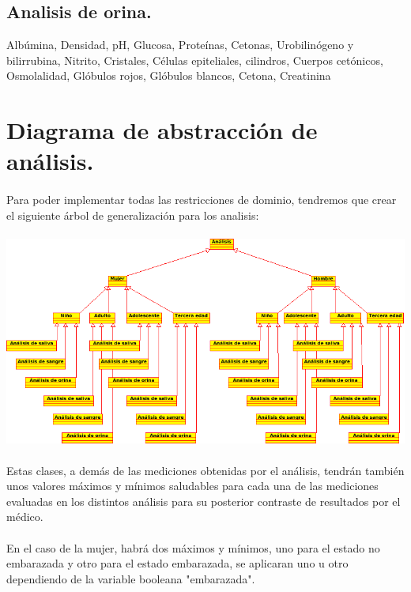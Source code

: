 \documentclass[a4paper,10pt]{article}
\begin{document}
\subsection{Analisis de orina.}
Albúmina, Densidad, pH, Glucosa, Proteínas, Cetonas, Urobilinógeno y bilirrubina, Nitrito, Cristales, Células epiteliales, cilindros, Cuerpos cetónicos, Osmolalidad, Glóbulos rojos, Glóbulos blancos, Cetona, Creatinina
\pagebreak

\section{Diagrama de abstracción de análisis.}
\paragraph{}
Para poder implementar todas las restricciones de dominio, tendremos que crear el siguiente árbol de generalización para los analisis:\\
\vspace{0.7cm}\\
\includegraphics[width=\textwidth]{img/analisis.png}
\paragraph{}
Estas clases, a demás de las mediciones obtenidas por el análisis, tendrán también unos valores máximos y mínimos saludables para cada una de las mediciones evaluadas en los distintos análisis para su posterior contraste de resultados por el médico.
\paragraph{}
En el caso de la mujer, habrá dos máximos y mínimos, uno para el estado no embarazada y otro para el estado embarazada, se aplicaran uno u otro dependiendo de la variable booleana "embarazada".
\end{document}
